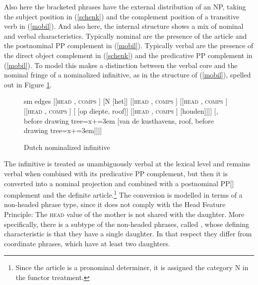 \documentclass[output=paper
                ,modfonts
                ,nonflat
	        ,collection
	        ,collectionchapter
	        ,collectiontoclongg
 	        ,biblatex
                ,babelshorthands
                ,newtxmath
                ,draftmode
                ,colorlinks, citecolor=brown
]{./langsci/langscibook}
\begin{document}
\noindent
Also here the bracketed phrases have the external distribution of an NP, 
taking the subject position in (\ref{schenk}) and 
the complement position of a transitive verb in (\ref{mobil}). 
And also here, the internal structure shows a mix of nominal and verbal
characteristics. 
Typically nominal are the presence of the article and the postnominal PP
complement in (\ref{mobil}). 
Typically verbal are the presence of the direct object complement in (\ref{schenk})
and the predicative PP complement in (\ref{mobil}). 
To model this \citet{VanEynde19} makes a distinction between the verbal core 
and the nominal fringe of a nominalized infinitive, as in the structure of 
(\ref{mobil}), spelled out in Figure \ref{kust}.  

\begin{figure}
	\centering
	\begin{forest}
sm edges
[{[\textsc{head}  , \textsc{comps} \eliste]}
	[N [het]]
	[{[\textsc{head} , \textsc{comps} \eliste]}
		[{[\textsc{head} , \textsc{comps} ]}
			[{[\textsc{head}  , \textsc{comps} ]}
			[ [op diepte, roof]]
			[{[\textsc{head} , \textsc{comps} ]} [houden]]]]
		[, before drawing tree={x+=3em} [van de kusthavens, roof, before drawing tree={x+=3em}]]]]
	\end{forest}
	\caption{\label{kust} Dutch nominalized infinitive}
\end{figure}   

The infinitive is treated as unambiguously verbal at the lexical level and 
remains verbal when combined with its predicative PP complement, but then it  
is converted into a nominal projection and combined with a postnominal PP[]
complement and the definite article.\footnote{Since the article is a pronominal 
determiner, it is assigned the category N in the functor treatment.}     
The conversion is modelled in terms of a non-headed phrase type, 
since it does not comply with the Head Feature Principle: 
The \textsc{head} value of the mother is not shared with the daughter.  
More specifically, there is a subtype of the non-headed phrases, called , 
whose defining characteristic is that they have a single daughter. 
In that respect they differ from coordinate phrases, which have at least two daughters.  

\begin{exe} 
\ex\label{conv} 
\begin{avm} 
\end{avm}
\end{exe}
\end{document}
